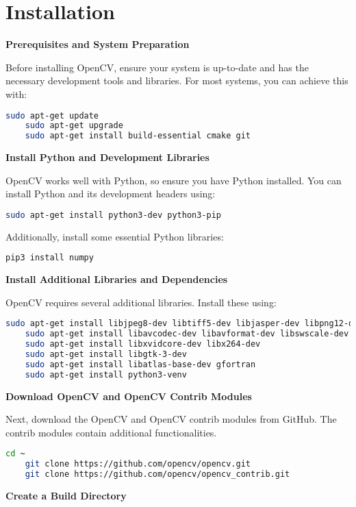 \section{Installation}

\textbf{Prerequisites and System Preparation}

Before installing OpenCV, ensure your system is up-to-date and has the necessary development tools and libraries. For most systems, you can achieve this with:
\begin{lstlisting}[language=bash]
	sudo apt-get update
	sudo apt-get upgrade
	sudo apt-get install build-essential cmake git
\end{lstlisting}

\textbf{Install Python and Development Libraries}

OpenCV works well with Python, so ensure you have Python installed. You can install Python and its development headers using:
\begin{lstlisting}[language=bash]
	sudo apt-get install python3-dev python3-pip
\end{lstlisting}
Additionally, install some essential Python libraries:
\begin{lstlisting}[language=bash]
	pip3 install numpy
\end{lstlisting}

\textbf{Install Additional Libraries and Dependencies}

OpenCV requires several additional libraries. Install these using:
\begin{lstlisting}[language=bash]
	sudo apt-get install libjpeg8-dev libtiff5-dev libjasper-dev libpng12-dev
	sudo apt-get install libavcodec-dev libavformat-dev libswscale-dev libv4l-dev
	sudo apt-get install libxvidcore-dev libx264-dev
	sudo apt-get install libgtk-3-dev
	sudo apt-get install libatlas-base-dev gfortran
	sudo apt-get install python3-venv
\end{lstlisting}

\textbf{Download OpenCV and OpenCV Contrib Modules}

Next, download the OpenCV and OpenCV contrib modules from GitHub. The contrib modules contain additional functionalities.
\begin{lstlisting}[language=bash]
	cd ~
	git clone https://github.com/opencv/opencv.git
	git clone https://github.com/opencv/opencv_contrib.git
\end{lstlisting}

\textbf{Create a Build Directory}

